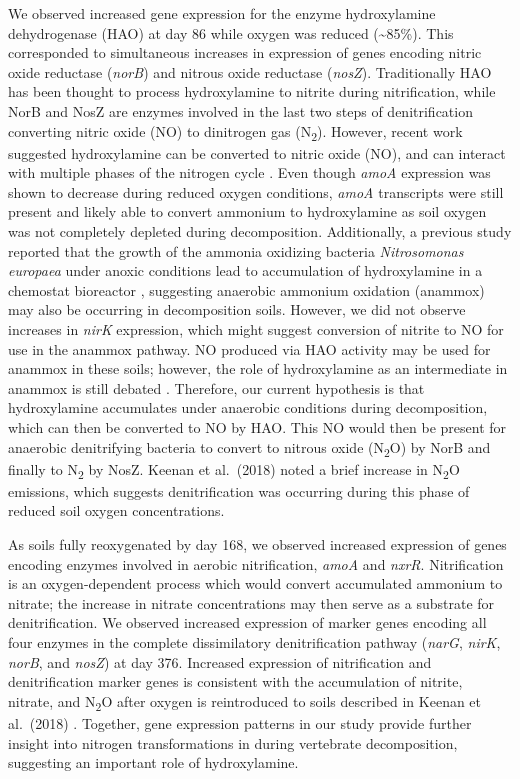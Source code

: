 \documentclass[
  sn-nature,
  lineno, referee]{sn-jnl}
\begin{document}
We observed increased gene expression for the enzyme hydroxylamine
dehydrogenase (HAO) at day 86 while oxygen was reduced
(\textasciitilde85\%). This corresponded to simultaneous increases in
expression of genes encoding nitric oxide reductase (\emph{norB}) and
nitrous oxide reductase (\emph{nosZ}). Traditionally HAO has been
thought to process hydroxylamine to nitrite during nitrification, while
NorB and NosZ are enzymes involved in the last two steps of
denitrification converting nitric oxide (NO) to dinitrogen gas
(N\textsubscript{2}). However, recent work suggested hydroxylamine can
be converted to nitric oxide (NO), and can interact with multiple phases
of the nitrogen cycle \citep{soler-jofra_hydroxylamine_2021}. Even
though \emph{amoA} expression was shown to decrease during reduced
oxygen conditions, \emph{amoA} transcripts were still present and likely
able to convert ammonium to hydroxylamine as soil oxygen was not
completely depleted during decomposition. Additionally, a previous study
reported that the growth of the ammonia oxidizing bacteria
\emph{Nitrosomonas europaea} under anoxic conditions lead to
accumulation of hydroxylamine in a chemostat bioreactor
\citep{yu_nitrosomonas_2018}, suggesting anaerobic ammonium oxidation
(anammox) may also be occurring in decomposition soils. However, we did
not observe increases in \emph{nirK} expression, which might suggest
conversion of nitrite to NO for use in the anammox pathway. NO produced
via HAO activity may be used for anammox in these soils; however, the
role of hydroxylamine as an intermediate in anammox is still debated
\citep{soler-jofra_hydroxylamine_2021}. Therefore, our current
hypothesis is that hydroxylamine accumulates under anaerobic conditions
during decomposition, which can then be converted to NO by HAO. This NO
would then be present for anaerobic denitrifying bacteria to convert to
nitrous oxide (N\textsubscript{2}O) by NorB and finally to
N\textsubscript{2} by NosZ. Keenan et al.~(2018)
\citep{keenan_mortality_2018} noted a brief increase in
N\textsubscript{2}O emissions, which suggests denitrification was
occurring during this phase of reduced soil oxygen concentrations.

As soils fully reoxygenated by day 168, we observed increased expression
of genes encoding enzymes involved in aerobic nitrification, \emph{amoA}
and \emph{nxrR}. Nitrification is an oxygen-dependent process which
would convert accumulated ammonium to nitrate; the increase in nitrate
concentrations may then serve as a substrate for denitrification. We
observed increased expression of marker genes encoding all four enzymes
in the complete dissimilatory denitrification pathway (\emph{narG},
\emph{nirK}, \emph{norB}, and \emph{nosZ}) at day 376. Increased
expression of nitrification and denitrification marker genes is
consistent with the accumulation of nitrite, nitrate, and
N\textsubscript{2}O after oxygen is reintroduced to soils described in
Keenan et al.~(2018)
\citep{keenan_mortality_2018, debruyn_carrion_2024}. Together, gene
expression patterns in our study provide further insight into nitrogen
transformations in during vertebrate decomposition, suggesting an
important role of hydroxylamine.
\end{document}
